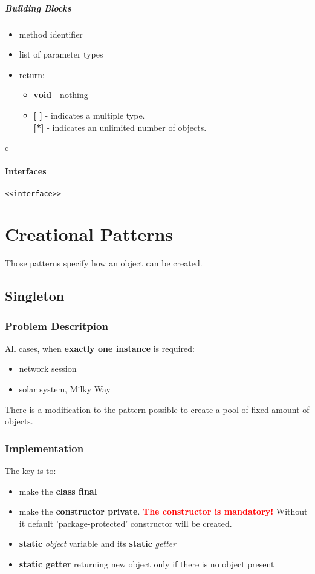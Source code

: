 \documentclass{report}
\begin{document}
\subsubsection{Building Blocks}
\begin{itemize}
  \item method identifier
  \item list of parameter types
  \item return:
  	\begin{itemize}
  	  \item \textbf{void} - nothing 
  	  \item \textbf{[ ]} - indicates a multiple type.\\
\textbf{[*]} - indicates an unlimited number of objects.
	\end{itemize}
\end{itemize}

c\subsection{Interfaces}
\begin{verbatim}
<<interface>>
\end{verbatim}




\part{Creational Patterns}

Those patterns specify how an object can be created.


\chapter{Singleton}

\section{Problem Descritpion}
All cases, when \textbf{exactly one instance} is required:
\begin{itemize}
	\item network session
	\item solar system, Milky Way
\end{itemize}
There is a modification to the pattern possible to create a pool of fixed amount of objects.

\section{Implementation}
The key is to:
\begin{itemize}
	\item make the \textbf{class final}
	\item make the \textbf{constructor private}. \textbf{\textcolor{red}{The constructor is mandatory!}} Without it default 'package-protected'
	constructor will be created.
	\item \textbf{static} \textit{object} variable and its \textbf{static} \textit{getter}
	\item \textbf{static getter} returning new object only if there is no object present
\end{itemize}
\end{document}
